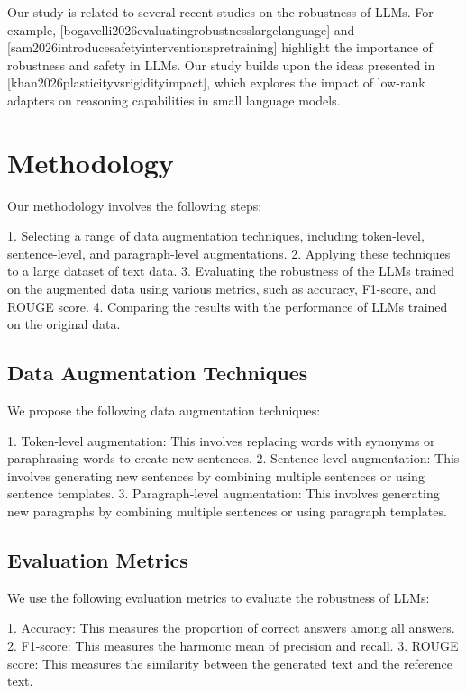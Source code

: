 \documentclass{article}
\begin{document}
Our study is related to several recent studies on the robustness of LLMs. For example, [bogavelli2026evaluatingrobustnesslargelanguage] and [sam2026introducesafetyinterventionspretraining] highlight the importance of robustness and safety in LLMs. Our study builds upon the ideas presented in [khan2026plasticityvsrigidityimpact], which explores the impact of low-rank adapters on reasoning capabilities in small language models.

\section{Methodology}

Our methodology involves the following steps:

1. Selecting a range of data augmentation techniques, including token-level, sentence-level, and paragraph-level augmentations.
2. Applying these techniques to a large dataset of text data.
3. Evaluating the robustness of the LLMs trained on the augmented data using various metrics, such as accuracy, F1-score, and ROUGE score.
4. Comparing the results with the performance of LLMs trained on the original data.

\subsection{Data Augmentation Techniques}

We propose the following data augmentation techniques:

1. Token-level augmentation: This involves replacing words with synonyms or paraphrasing words to create new sentences.
2. Sentence-level augmentation: This involves generating new sentences by combining multiple sentences or using sentence templates.
3. Paragraph-level augmentation: This involves generating new paragraphs by combining multiple sentences or using paragraph templates.

\subsection{Evaluation Metrics}

We use the following evaluation metrics to evaluate the robustness of LLMs:

1. Accuracy: This measures the proportion of correct answers among all answers.
2. F1-score: This measures the harmonic mean of precision and recall.
3. ROUGE score: This measures the similarity between the generated text and the reference text.
\end{document}
